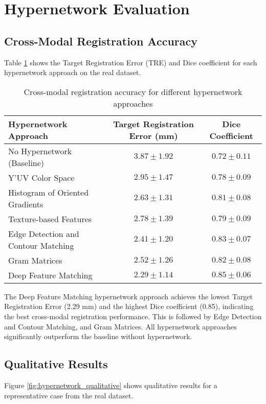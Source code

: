 \section{Hypernetwork Evaluation}

\subsection{Cross-Modal Registration Accuracy}
Table \ref{tab:hypernetwork_accuracy} shows the Target Registration Error (TRE) and Dice coefficient for each hypernetwork approach on the real dataset.

\begin{table}[h]
\centering
\caption{Cross-modal registration accuracy for different hypernetwork approaches}
\label{tab:hypernetwork_accuracy}
\begin{tabular}{lcc}
\toprule
\textbf{Hypernetwork Approach} & \textbf{Target Registration Error (mm)} & \textbf{Dice Coefficient} \\
\midrule
No Hypernetwork (Baseline) & $3.87 \pm 1.92$ & $0.72 \pm 0.11$ \\
Y'UV Color Space & $2.95 \pm 1.47$ & $0.78 \pm 0.09$ \\
Histogram of Oriented Gradients & $2.63 \pm 1.31$ & $0.81 \pm 0.08$ \\
Texture-based Features & $2.78 \pm 1.39$ & $0.79 \pm 0.09$ \\
Edge Detection and Contour Matching & $2.41 \pm 1.20$ & $0.83 \pm 0.07$ \\
Gram Matrices & $2.52 \pm 1.26$ & $0.82 \pm 0.08$ \\
Deep Feature Matching & $2.29 \pm 1.14$ & $0.85 \pm 0.06$ \\
\bottomrule
\end{tabular}
\end{table}

The Deep Feature Matching hypernetwork approach achieves the lowest Target Registration Error (2.29 mm) and the highest Dice coefficient (0.85), indicating the best cross-modal registration performance. This is followed by Edge Detection and Contour Matching, and Gram Matrices. All hypernetwork approaches significantly outperform the baseline without hypernetwork.

\subsection{Qualitative Results}
Figure \ref{fig:hypernetwork_qualitative} shows qualitative results for a representative case from the real dataset.

